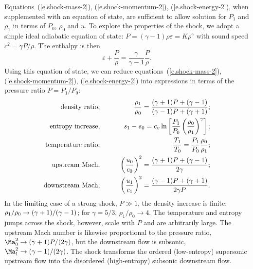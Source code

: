 Equations~(\ref{e.shock-mass-2}), (\ref{e.shock-momentum-2}), (\ref{e.shock-energy-2}), when supplemented with an equation of state, are sufficient to allow solution for $P_{1}$ and $\rho_{1}$ in terms of $P_{0}$, $\rho_{0}$ and $u$. To explore the properties of the shock, we adopt a simple ideal adiabatic equation of state: $P =  (\gamma - 1)\rho\varepsilon = K \rho^{\gamma}$ with sound speed $c^{2} = \gamma P/\rho$.  The enthalpy is then
\[ \varepsilon + \frac{P}{\rho} = \frac{\gamma}{\gamma-1}\frac{P}{\rho}. \]
Using this equation of state, we can reduce equations~(\ref{e.shock-mass-2}), (\ref{e.shock-momentum-2}), (\ref{e.shock-energy-2}) into expressions in terms of the pressure ratio $P = P_{1}/P_{0}$:
\begin{eqnarray}
	\textrm{density ratio,}&\qquad& \frac{\rho_{1}}{\rho_{0}} 
			= \frac{(\gamma+1) P + (\gamma-1)}{(\gamma-1) P +  (\gamma+1)};\\
	\textrm{entropy increase,} &\qquad& s_{1}-s_{0} 
		= c_{v}\ln\left[\frac{P_{1}}{P_{0}}\left(\frac{\rho_{0}}{\rho_{1}}\right)^{\gamma}\right];\\
	\textrm{temperature ratio,} &\qquad& \frac{T_{1}}{T_{0}} = \frac{P_{1}}{P_{0}}\frac{\rho_{0}}{\rho_{1}};\\
	\textrm{upstream Mach,} &\qquad& \left(\frac{u_{0}}{c_{0}}\right)^{2} = \frac{(\gamma+1) P + (\gamma-1)}{2\gamma};\\
	\textrm{downstream Mach,} &\qquad& \left(\frac{u_{1}}{c_{1}}\right)^{2} 
			= \frac{(\gamma-1) P + (\gamma+1)}{2\gamma P}.
\end{eqnarray}
In the limiting case of a strong shock, $P \gg 1$, the density increase is finite: $\rho_{1}/\rho_{0} \to (\gamma+1)/(\gamma-1)$; for $\gamma = 5/3$, $\rho_{1}/\rho_{0}\to 4$.  The temperature and entropy jumps across the shock, however, scale with $P$ and are arbitrarily large.  The upstream Mach number is likewise proportional to the pressure ratio, $\Ma_{0}^{2} \to \gpo P/(2\gamma)$, but the downstream flow is subsonic, $\Ma_{1}^{2} \to \gmo/(2\gamma)$. The shock transforms the ordered (low-entropy) supersonic upstream flow into the disordered (high-entropy) subsonic downstream flow.
